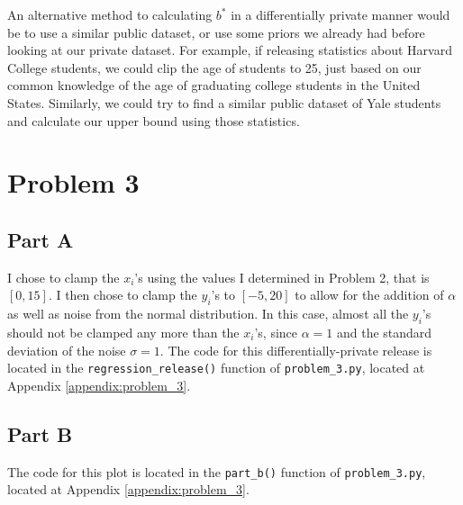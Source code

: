 \documentclass[12pt]{article}
\def\cl{\lstinline}
\begin{document}
\noindent

An alternative method to calculating $b^*$ in a differentially private manner would be to use a similar public dataset, or use some priors we already had before looking at our private dataset. For example, if releasing statistics about Harvard College students, we could clip the age of students to 25, just based on our common knowledge of the age of graduating college students in the United States. Similarly, we could try to find a similar public dataset of Yale students and calculate our upper bound using those statistics.

\newpage

\section{Problem 3}

\subsection{Part A}

\noindent

I chose to clamp the $x_i$'s using the values I determined in Problem 2, that is $[0, 15]$. I then chose to clamp the $y_i$'s to $[-5, 20]$ to allow for the addition of $\alpha$ as well as noise from the normal distribution. In this case, almost all the $y_i$'s should not be clamped any more than the $x_i$'s, since $\alpha = 1$ and the standard deviation of the noise $\sigma = 1$. The code for this differentially-private release is located in the \cl{regression_release()} function of \cl{problem_3.py}, located at Appendix \ref{appendix:problem_3}.

\subsection{Part B}

The code for this plot is located in the \cl{part_b()} function of \cl{problem_3.py}, located at Appendix \ref{appendix:problem_3}.
\end{document}
